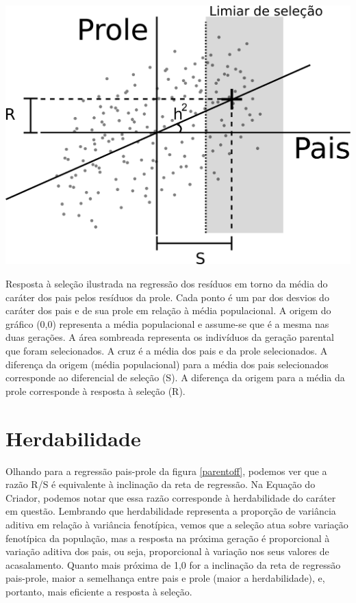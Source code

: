 \documentclass[portuges,]{tufte-handout}
\begin{document}
\begin{marginfigure}
\includegraphics{./figuras/parent-offspring.png}
\caption{Resposta à seleção ilustrada na regressão dos resíduos
em torno da média do caráter dos pais pelos resíduos da prole. Cada
ponto é um par dos desvios do caráter dos pais e de sua prole em relação
à média populacional. A origem do gráfico (0,0) representa a média
populacional e assume-se que é a mesma nas duas gerações. A área
sombreada representa os indivíduos da geração parental que foram
selecionados. A cruz é a média dos pais e da prole selecionados. A
diferença da origem (média populacional) para a média dos pais
selecionados corresponde ao diferencial de seleção (S). A diferença da
origem para a média da prole corresponde à resposta à seleção (R).}
\label{parentoff}
\end{marginfigure}

\section{Herdabilidade}\label{herdabilidade}

Olhando para a regressão pais-prole da figura \ref{parentoff}, podemos
ver que a razão R/S é equivalente à inclinação da reta de regressão. Na
Equação do Criador, podemos notar que essa razão corresponde à
herdabilidade do caráter em questão. Lembrando que herdabilidade
representa a proporção de variância aditiva em relação à variância
fenotípica, vemos que a seleção atua sobre variação fenotípica da
população, mas a resposta na próxima geração é proporcional à variação
aditiva dos pais, ou seja, proporcional à variação nos seus valores de
acasalamento. Quanto mais próxima de 1,0 for a inclinação da reta de
regressão pais-prole, maior a semelhança entre pais e prole (maior a
herdabilidade), e, portanto, mais eficiente a resposta à seleção.
\end{document}
